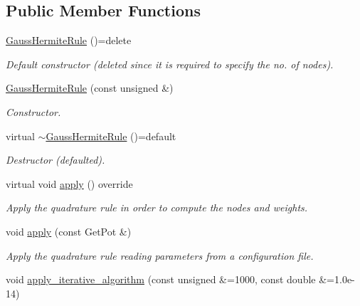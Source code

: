 \subsection*{Public Member Functions}
\begin{DoxyCompactItemize}
\item 
\hypertarget{classGaussHermiteRule_a82318908e412ac924a27d7c816c5e89d}{\hyperlink{classGaussHermiteRule_a82318908e412ac924a27d7c816c5e89d}{Gauss\-Hermite\-Rule} ()=delete}\label{classGaussHermiteRule_a82318908e412ac924a27d7c816c5e89d}

\begin{DoxyCompactList}\small\item\em Default constructor (deleted since it is required to specify the no. of nodes). \end{DoxyCompactList}\item 
\hyperlink{classGaussHermiteRule_a578638d12f9b74af6a94428eb939e57a}{Gauss\-Hermite\-Rule} (const unsigned \&)
\begin{DoxyCompactList}\small\item\em Constructor. \end{DoxyCompactList}\item 
\hypertarget{classGaussHermiteRule_ade51ec8543da3071631a6e1dbf1ac9f7}{virtual \hyperlink{classGaussHermiteRule_ade51ec8543da3071631a6e1dbf1ac9f7}{$\sim$\-Gauss\-Hermite\-Rule} ()=default}\label{classGaussHermiteRule_ade51ec8543da3071631a6e1dbf1ac9f7}

\begin{DoxyCompactList}\small\item\em Destructor (defaulted). \end{DoxyCompactList}\item 
\hypertarget{classGaussHermiteRule_ae5502fed0f3128dce83d1280a834ffac}{virtual void \hyperlink{classGaussHermiteRule_ae5502fed0f3128dce83d1280a834ffac}{apply} () override}\label{classGaussHermiteRule_ae5502fed0f3128dce83d1280a834ffac}

\begin{DoxyCompactList}\small\item\em Apply the quadrature rule in order to compute the nodes and weights. \end{DoxyCompactList}\item 
void \hyperlink{classGaussHermiteRule_aedfa3b506bf5faafad17567ae2c6bed4}{apply} (const Get\-Pot \&)
\begin{DoxyCompactList}\small\item\em Apply the quadrature rule reading parameters from a configuration file. \end{DoxyCompactList}\item 
\hypertarget{classGaussHermiteRule_a5cbc7c77124838d27b8ccf686e5f7ff8}{void \hyperlink{classGaussHermiteRule_a5cbc7c77124838d27b8ccf686e5f7ff8}{apply\-\_\-iterative\-\_\-algorithm} (const unsigned \&=1000, const double \&=1.\-0e-\/14)}\label{classGaussHermiteRule_a5cbc7c77124838d27b8ccf686e5f7ff8}


\end{DoxyCompactItemize}
